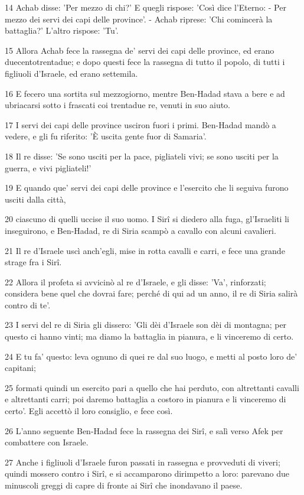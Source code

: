 \par 14 Achab disse: 'Per mezzo di chi?' E quegli rispose: 'Così dice l'Eterno: - Per mezzo dei servi dei capi delle province'. - Achab riprese: 'Chi comincerà la battaglia?' L'altro rispose: 'Tu'.
\par 15 Allora Achab fece la rassegna de' servi dei capi delle province, ed erano duecentotrentadue; e dopo questi fece la rassegna di tutto il popolo, di tutti i figliuoli d'Israele, ed erano settemila.
\par 16 E fecero una sortita sul mezzogiorno, mentre Ben-Hadad stava a bere e ad ubriacarsi sotto i frascati coi trentadue re, venuti in suo aiuto.
\par 17 I servi dei capi delle province usciron fuori i primi. Ben-Hadad mandò a vedere, e gli fu riferito: 'È uscita gente fuor di Samaria'.
\par 18 Il re disse: 'Se sono usciti per la pace, pigliateli vivi; se sono usciti per la guerra, e vivi pigliateli!'
\par 19 E quando que' servi dei capi delle province e l'esercito che li seguiva furono usciti dalla città,
\par 20 ciascuno di quelli uccise il suo uomo. I Sirî si diedero alla fuga, gl'Israeliti li inseguirono, e Ben-Hadad, re di Siria scampò a cavallo con alcuni cavalieri.
\par 21 Il re d'Israele uscì anch'egli, mise in rotta cavalli e carri, e fece una grande strage fra i Sirî.
\par 22 Allora il profeta si avvicinò al re d'Israele, e gli disse: 'Va', rinforzati; considera bene quel che dovrai fare; perché di qui ad un anno, il re di Siria salirà contro di te'.
\par 23 I servi del re di Siria gli dissero: 'Gli dèi d'Israele son dèi di montagna; per questo ci hanno vinti; ma diamo la battaglia in pianura, e li vinceremo di certo.
\par 24 E tu fa' questo: leva ognuno di quei re dal suo luogo, e metti al posto loro de' capitani;
\par 25 formati quindi un esercito pari a quello che hai perduto, con altrettanti cavalli e altrettanti carri; poi daremo battaglia a costoro in pianura e li vinceremo di certo'. Egli accettò il loro consiglio, e fece così.
\par 26 L'anno seguente Ben-Hadad fece la rassegna dei Sirî, e salì verso Afek per combattere con Israele.
\par 27 Anche i figliuoli d'Israele furon passati in rassegna e provveduti di viveri; quindi mossero contro i Sirî, e si accamparono dirimpetto a loro: parevano due minuscoli greggi di capre di fronte ai Sirî che inondavano il paese.
